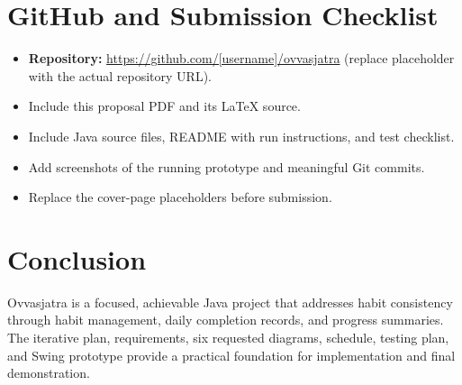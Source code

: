 \documentclass[11pt,a4paper]{article}
\begin{document}
\section{GitHub and Submission Checklist}
\begin{itemize}
\item \textbf{Repository:} \url{https://github.com/[username]/ovvasjatra} (replace placeholder with the actual repository URL).
\item Include this proposal PDF and its \LaTeX{} source.
\item Include Java source files, README with run instructions, and test checklist.
\item Add screenshots of the running prototype and meaningful Git commits.
\item Replace the cover-page placeholders before submission.
\end{itemize}

\section{Conclusion}
Ovvasjatra is a focused, achievable Java project that addresses habit consistency through habit management, daily completion records, and progress summaries. The iterative plan, requirements, six requested diagrams, schedule, testing plan, and Swing prototype provide a practical foundation for implementation and final demonstration.
\end{document}
